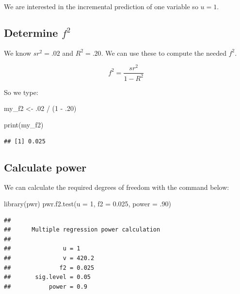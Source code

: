\documentclass[
]{krantz}
\makeatletter
\newenvironment{Shaded}{\begin{snugshade}}{\end{snugshade}}
\newcommand{\AttributeTok}[1]{\textcolor[rgb]{0.61,0.61,0.61}{#1}}
\newcommand{\DecValTok}[1]{\textcolor[rgb]{0.06,0.06,0.06}{#1}}
\newcommand{\FloatTok}[1]{\textcolor[rgb]{0.06,0.06,0.06}{#1}}
\newcommand{\FunctionTok}[1]{\textcolor[rgb]{0,0,0}{#1}}
\newcommand{\NormalTok}[1]{#1}
\newcommand{\OtherTok}[1]{\textcolor[rgb]{0.37,0.37,0.37}{#1}}
\newcommand{\SpecialCharTok}[1]{\textcolor[rgb]{0,0,0}{#1}}
\newenvironment{kframe}{%
\medskip{}
\setlength{\fboxsep}{.8em}
 \def\at@end@of@kframe{}%
 \ifinner\ifhmode%
  \def\at@end@of@kframe{\end{minipage}}%
  \begin{minipage}{\columnwidth}%
 \fi\fi%
 \def\FrameCommand##1{\hskip\@totalleftmargin \hskip-\fboxsep
 \colorbox{shadecolor}{##1}\hskip-\fboxsep
     \hskip-\linewidth \hskip-\@totalleftmargin \hskip\columnwidth}%
 \MakeFramed {\advance\hsize-\width
   \@totalleftmargin\z@ \linewidth\hsize
   \@setminipage}}%
 {\par\unskip\endMakeFramed%
 \at@end@of@kframe}
\renewenvironment{Shaded}{\begin{kframe}}{\end{kframe}}
\makeatother
\begin{document}
We are interested in the incremental prediction of one variable so \(u = 1\).

\hypertarget{determine-f2}{%
\subsection{\texorpdfstring{Determine \(f^2\)}{Determine f\^{}2}}\label{determine-f2}}

We know \(sr^2=.02\) and \(R^2 = .20\). We can use these to compute the needed \(f^2\).

\[
f^2=\frac{sr^2}{1-R^2}
\]

So we type:

\begin{Shaded}
\begin{Highlighting}[]
\NormalTok{my\_f2 }\OtherTok{\textless{}{-}}\NormalTok{ .}\DecValTok{02} \SpecialCharTok{/}\NormalTok{ (}\DecValTok{1} \SpecialCharTok{{-}}\NormalTok{ .}\DecValTok{20}\NormalTok{)}

\FunctionTok{print}\NormalTok{(my\_f2)}
\end{Highlighting}
\end{Shaded}

\begin{verbatim}
## [1] 0.025
\end{verbatim}

\hypertarget{calculate-power}{%
\subsection{Calculate power}\label{calculate-power}}

We can calculate the required degrees of freedom with the command below:

\begin{Shaded}
\begin{Highlighting}[]
\FunctionTok{library}\NormalTok{(pwr)}
\FunctionTok{pwr.f2.test}\NormalTok{(}\AttributeTok{u =} \DecValTok{1}\NormalTok{,}
            \AttributeTok{f2 =} \FloatTok{0.025}\NormalTok{,}
            \AttributeTok{power =}\NormalTok{ .}\DecValTok{90}\NormalTok{)}
\end{Highlighting}
\end{Shaded}

\begin{verbatim}
## 
##      Multiple regression power calculation 
## 
##               u = 1
##               v = 420.2
##              f2 = 0.025
##       sig.level = 0.05
##           power = 0.9
\end{verbatim}
\end{document}

